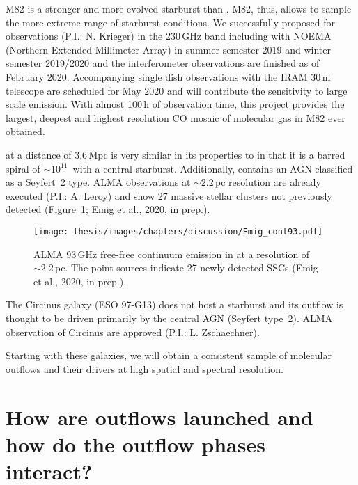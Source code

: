 M82 is a stronger \citep[$SFR \sim 13-33$\,\Msunyr; e.g.][]{2003ApJ...599..193F} and more evolved \citep[e.g.][]{2006ApJS..164..450M} starburst than . M82, thus, allows to sample the more extreme range of starburst conditions. We successfully proposed for observations (P.I.: N. Krieger) in the 230\,GHz band including  with NOEMA (Northern Extended Millimeter Array) in summer semester 2019 and winter semester 2019/2020 and the interferometer observations are finished as of February 2020. Accompanying single dish observations with the IRAM 30\,m telescope are scheduled for May 2020 and will contribute the sensitivity to large scale emission. With almost 100\,h of observation time, this project provides the largest, deepest and highest resolution CO mosaic of molecular gas in M82 ever obtained.

 at a distance of 3.6\,Mpc is very similar in its properties to  in that it is a barred spiral of $\sim 10^{11}$\,\Msun \citep[: $\sim 5\times10^{10}$\,\Msun][]{1991AJ....101..456P} with a central starburst. Additionally,  contains an AGN classified as a Seyfert~2 type. ALMA observations at $\sim 2.2$\,pc resolution are already executed (P.I.: A. Leroy) and show 27 massive stellar clusters not previously detected (Figure~\ref{discussion: figure: ngc4945 SSCs}; Emig et al., 2020, in prep.).

\begin{figure}
    \centering
    \texttt{[image: thesis/images/chapters/discussion/Emig\_cont93.pdf]}
    \caption[Newly detected SSCs in ]{ALMA 93\,GHz free-free continuum emission in  at a resolution of $\sim 2.2$\,pc. The point-sources indicate 27 newly detected SSCs (Emig et al., 2020, in prep.).
    }
    \label{discussion: figure: ngc4945 SSCs}
\end{figure}

The Circinus galaxy (ESO 97-G13) does not host a starburst and its outflow is thought to be driven primarily by the central AGN (Seyfert type~2). ALMA observation of Circinus are approved (P.I.: L. Zschaechner).

Starting with these galaxies, we will obtain a consistent sample of molecular outflows and their drivers at high spatial and spectral resolution. 



\section{How are outflows launched and how do the outflow phases interact?}
\label{discussion: section: outflow launching}

